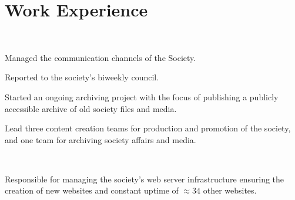 \documentclass[]{hieudo-build}
\begin{document}
\begin{minipage}[t]{0.69\textwidth}


\section{Work Experience}

 \\
\begin{tightemize} 
\item Managed the communication channels of the Society.
\item Reported to the society's biweekly council.
\item Started an ongoing archiving project with the focus of publishing a publicly accessible archive of old society files and media.
\item Lead three content creation teams for production and promotion of the society, and one team for archiving society affairs and media.
\end{tightemize}
\sectionsep

\\
\begin{tightemize}
\item Responsible for managing the society's web server infrastructure ensuring the creation of new websites and constant uptime of $\approx 34$ other websites.
\end{tightemize}
\sectionsep


\end{minipage}
\end{document}

